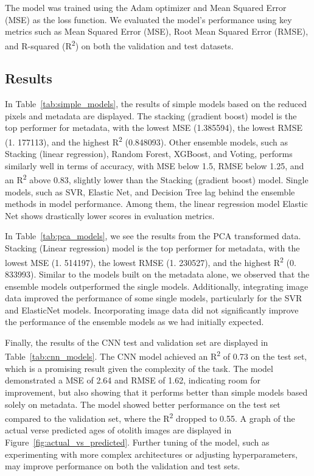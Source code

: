 The model was trained using the Adam optimizer and Mean Squared Error (MSE) as the loss function.
We evaluated the model's performance using key metrics such as Mean Squared Error (MSE), Root Mean Squared Error (RMSE), and R-squared (R\textsuperscript{2}) on both the validation and test datasets.

\subsection{Results}

In Table~\ref{tab:simple_models}, the results of simple models based on the reduced pixels and metadata are displayed.
The stacking (gradient boost) model is the top performer for metadata, with the lowest MSE (1.385594), the lowest RMSE (1. 177113), and the highest R\textsuperscript{2} (0.848093).
Other ensemble models, such as Stacking (linear regression), Random Forest, XGBoost, and Voting, performs similarly well in terms of accuracy, with MSE below 1.5, RMSE below 1.25, and an R\textsuperscript{2} above 0.83, slightly lower than the Stacking (gradient boost) model.
Single models, such as SVR, Elastic Net, and Decision Tree lag behind the ensemble methods in model performance.
Among them, the linear regression model Elastic Net shows drastically lower scores in evaluation metrics.

In Table~\ref{tab:pca_models}, we see the results from the PCA transformed data.
Stacking (Linear regression) model is the top performer for metadata, with the lowest MSE (1. 514197), the lowest RMSE (1. 230527), and the highest R\textsuperscript{2} (0. 833993).
Similar to the models built on the metadata alone, we observed that the ensemble models outperformed the single models.
Additionally, integrating image data improved the performance of some single models, particularly for the SVR and ElasticNet models.
Incorporating image data did not significantly improve the performance of the ensemble models as we had initially expected.

Finally, the results of the CNN test and validation set are displayed in Table~\ref{tab:cnn_models}.
The CNN model achieved an R\textsuperscript{2} of 0.73 on the test set, which is a promising result given the complexity of the task.
The model demonstrated a MSE of 2.64 and RMSE of 1.62, indicating room for improvement, but also showing that it performs better than simple models based solely on metadata.
The model showed better performance on the test set compared to the validation set, where the R\textsuperscript{2} dropped to 0.55.
A graph of the actual verse predicted ages of otolith images are displayed in Figure~\ref{fig:actual_vs_predicted}.
Further tuning of the model, such as experimenting with more complex architectures or adjusting hyperparameters, may improve performance on both the validation and test sets.

